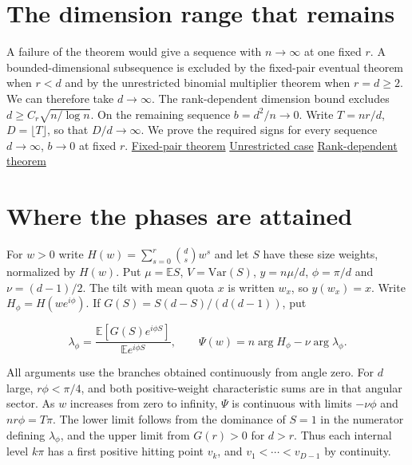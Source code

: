 \section{The dimension range that remains}

A failure of the theorem would give a sequence with $n\to\infty$ at one fixed $r$. A bounded-dimensional subsequence is excluded by the fixed-pair eventual theorem when $r<d$ and by the unrestricted binomial multiplier theorem when $r=d\ge2$. We can therefore take $d\to\infty$. The rank-dependent dimension bound excludes $d\ge C_r\sqrt{n/\log n}$. On the remaining sequence $b=d^2/n\to0$. Write $T=nr/d$, $D=\lfloor T\rfloor$, so that $D/d\to\infty$. We prove the required signs for every sequence $d\to\infty$, $b\to0$ at fixed $r$. \href{https://github.com/ProgramComputer/open-math-research/blob/ba7ddfd7efb37cac33769f4fdfed749e1b5bf58a/topics/balanced-arrays/fixed-rank-eventual.pdf}{Fixed-pair theorem} \enspace \href{https://github.com/ProgramComputer/open-math-research/blob/ba7ddfd7efb37cac33769f4fdfed749e1b5bf58a/topics/balanced-arrays/finite-linear-reduction.md}{Unrestricted case} \enspace \href{https://github.com/ProgramComputer/open-math-research/tree/ba7ddfd7efb37cac33769f4fdfed749e1b5bf58a/topics/balanced-arrays/dense-regime/rank-dependent}{Rank-dependent theorem}

\section{Where the phases are attained}

For $w>0$ write $H(w)=\sum_{s=0}^r\binom ds w^s$ and let $S$ have these size weights, normalized by $H(w)$. Put $\mu=\mathbb E S$, $V=\mathrm{Var}(S)$, $y=n\mu/d$, $\phi=\pi/d$ and $\nu=(d-1)/2$. The tilt with mean quota $x$ is written $w_x$, so $y(w_x)=x$. Write $H_\phi=H(we^{i\phi})$. If $G(S)=S(d-S)/(d(d-1))$, put

\begin{equation*}
\lambda_\phi=\frac{\mathbb E[G(S)e^{i\phi S}]}{\mathbb E e^{i\phi S}},
\qquad \Psi(w)=n\arg H_\phi-\nu\arg\lambda_\phi.
\end{equation*}

All arguments use the branches obtained continuously from angle zero. For $d$ large, $r\phi<\pi/4$, and both positive-weight characteristic sums are in that angular sector. As $w$ increases from zero to infinity, $\Psi$ is continuous with limits $-\nu\phi$ and $nr\phi=T\pi$. The lower limit follows from the dominance of $S=1$ in the numerator defining $\lambda_\phi$, and the upper limit from $G(r)>0$ for $d>r$. Thus each internal level $k\pi$ has a first positive hitting point $v_k$, and $v_1<\cdots<v_{D-1}$ by continuity.

